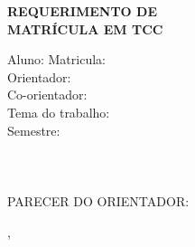 \documentclass[a4paper, 12pt]{paper}
\begin{document}
\begin{center}
 \Huge \bf REQUERIMENTO DE
\\ MATRÍCULA EM TCC
\end{center}
\noindent
Aluno: \dotuline{\student} \dotfill Matricula: \dotuline{\studentid} \dotfill \\
Orientador: \dotuline{\advisorName} \dotfill\\
Co-orientador: \dotuline{\coadvisorName} \dotfill\\
Tema do trabalho: \dotuline{\thesisTitle}\dotfill \\
Semestre: \dotuline{\semester} \dotfill
\\
\\
\demands
\\
\\
PARECER DO ORIENTADOR: 
\dotcolumnfill

\local, \dateRequirement

\end{document}
